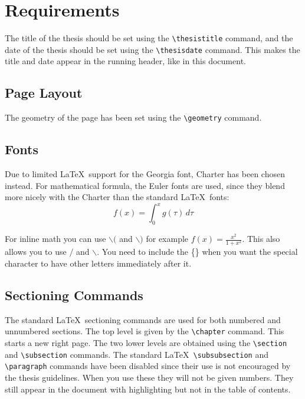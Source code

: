\chapter{Requirements}
\label{chap:requirements}

The title of the thesis should be set using the \verb+\thesistitle+
command, and the date of the thesis should be set using the
\verb+\thesisdate+ command. This makes the title and date appear in
the running header, like in this document.

\section{Page Layout}

The geometry of the page has been set using the \verb+\geometry+
command. 

\section{Fonts}

Due to limited \LaTeX\ support for the Georgia font, Charter has been
chosen instead. For mathematical formula, the Euler fonts are used,
since they blend more nicely with the Charter than the standard
\LaTeX\ fonts: 
$$
 f(x) = \int_0^x g(\tau)\,d\tau
$$

For inline math you can use $\backslash{}($ and $\backslash{})$ for example \( f(x)= \frac{x^2}{1+x^2} \).  
This also allows you to use $\slash$ and $\backslash$. You need to include the \{\} when you want the special
character to have other letters immediately after it.

\section{Sectioning Commands}

The standard \LaTeX\ sectioning commands are used for both numbered
and unnumbered sections. The top level is given by the \verb+\chapter+
command. This starts a new right page. The two lower levels are
obtained using the \verb+\section+ and \verb+\subsection+ commands.
The standard \LaTeX\ \verb+\subsubsection+ and \verb+\paragraph+
commands have been disabled since their use is not encouraged by the
thesis guidelines. When you use these they will not be given numbers.  
They still appear in the document with highlighting but not in the 
table of contents.

